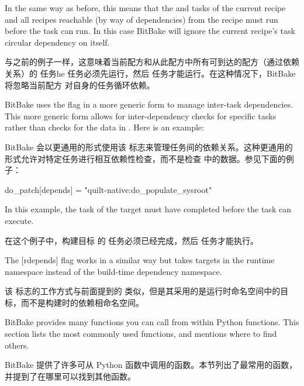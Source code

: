 In the same way as before, this means that the  and  tasks of the current recipe and all recipes reachable (by way of dependencies) from the recipe must run before the  task can run. In this case BitBake will ignore the current recipe's  task circular dependency on itself.

与之前的例子一样，这意味着当前配方和从此配方中所有可到达的配方（通过依赖关系）的  任务he  任务必须先运行，然后  任务才能运行。在这种情况下，BitBake 将忽略当前配方  对自身的任务循环依赖。

\label{section:Inter-Task Dependencies}

BitBake uses the \code{[depends]} flag in a more generic form to manage inter-task dependencies. This more generic form allows for inter-dependency checks for specific tasks rather than checks for the data in . Here is an example:

BitBake 会以更通用的形式使用该 \code{[depends]} 标志来管理任务间的依赖关系。这种更通用的形式允许对特定任务进行相互依赖性检查，而不是检查  中的数据。参见下面的例子：

\begin{pyglist}
do_patch[depends] = "quilt-native:do_populate_sysroot"
\end{pyglist}

In this example, the  task of the target  must have completed before the  task can execute.

在这个例子中，构建目标  的  任务必须已经完成，然后  任务才能执行。

The [rdepends] flag works in a similar way but takes targets in the runtime namespace instead of the build-time dependency namespace.

该 \code{[rdepends]} 标志的工作方式与前面提到的  类似，但是其采用的是运行时命名空间中的目标，而不是构建时的依赖相命名空间。

\label{section:Functions You Can Call From Within Python}
BitBake provides many functions you can call from within Python functions. This section lists the most commonly used functions, and mentions where to find others.

BitBake 提供了许多可从 Python 函数中调用的函数。本节列出了最常用的函数，并提到了在哪里可以找到其他函数。


